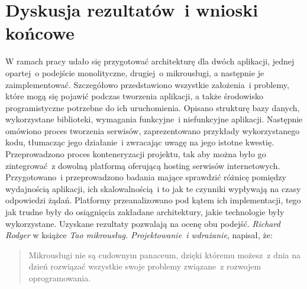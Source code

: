 \chapter{Dyskusja rezultatów~i wnioski końcowe}
\label{roz8}
W ramach pracy udało się przygotować architekturę dla dwóch aplikacji, jednej opartej~o podejście monolityczne, drugiej~o mikrousługi, a następnie je zaimplementować. Szczegółowo przedstawiono wszystkie założenia~i problemy, które mogą się pojawić podczas tworzenia aplikacji, a także środowisko programistyczne potrzebne do ich uruchomienia. Opisano strukturę bazy danych, wykorzystane biblioteki, wymagania funkcyjne~i niefunkcyjne aplikacji. Następnie omówiono proces tworzenia serwisów, zaprezentowano przykłady wykorzystanego kodu, tłumacząc jego działanie~i zwracając uwagę na jego istotne kwestię. Przeprowadzono proces konteneryzacji projektu, tak aby można było go zintegrować~z dowolną platformą oferującą hosting serwisów internetowych. Przygotowano~i przeprowadzono badania mające sprawdzić różnicę pomiędzy wydajnością aplikacji, ich skalowalnością~i to jak te czynniki wypływają na czasy odpowiedzi żądań. Platformy przeanalizowano pod kątem ich implementacji, tego jak trudne były do osiągnięcia zakładane architektury, jakie technologie były wykorzystane. Uzyskane rezultaty pozwalają na ocenę obu podejść. 
\textit{Richard Rodger} w książce \textit{Tao mikrousług. Projektowanie~i wdrażanie}, napisał, że: \begin{quotation}
  Mikrousługi nie są cudownym panaceum, dzięki któremu możesz~z dnia na dzień rozwiązać wszystkie swoje problemy związane~z rozwojem oprogramowania\cite{Rodger:2019}.
\end{quotation}
